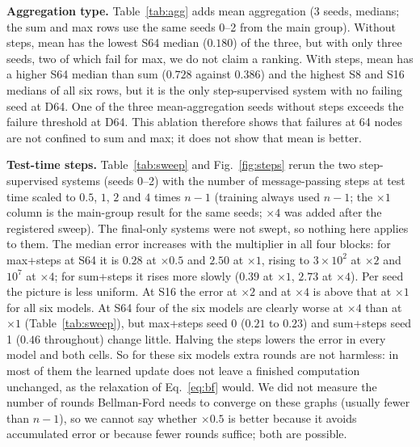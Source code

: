 \textbf{Aggregation type.} Table~\ref{tab:agg} adds mean aggregation (3 seeds, medians; the sum and max rows use the same seeds 0--2 from the main group). Without steps, mean has the lowest S64 median ($0.180$) of the three, but with only three seeds, two of which fail for max, we do not claim a ranking. With steps, mean has a higher S64 median than sum ($0.728$ against $0.386$) and the highest S8 and S16 medians of all six rows, but it is the only step-supervised system with no failing seed at D64. One of the three mean-aggregation seeds without steps exceeds the failure threshold at D64. This ablation therefore shows that failures at 64 nodes are not confined to sum and max; it does not show that mean is better.

\begin{table}[t]\centering\caption{Aggregation ablation, median MAE over seeds 0--2; in parentheses the number of seeds with MAE $>1$ or non-finite.}\label{tab:agg}
\small
\end{table}

\textbf{Test-time steps.} Table~\ref{tab:sweep} and Fig.~\ref{fig:steps} rerun the two step-supervised systems (seeds 0--2) with the number of message-passing steps at test time scaled to $0.5$, $1$, $2$ and $4$ times $n-1$ (training always used $n-1$; the $\times1$ column is the main-group result for the same seeds; $\times4$ was added after the registered sweep). The final-only systems were not swept, so nothing here applies to them. The median error increases with the multiplier in all four blocks: for max+steps at S64 it is $0.28$ at $\times0.5$ and $2.50$ at $\times1$, rising to $3\times10^{2}$ at $\times2$ and $10^{7}$ at $\times4$; for sum+steps it rises more slowly ($0.39$ at $\times1$, $2.73$ at $\times4$). Per seed the picture is less uniform. At S16 the error at $\times2$ and at $\times4$ is above that at $\times1$ for all six models. At S64 four of the six models are clearly worse at $\times4$ than at $\times1$ (Table~\ref{tab:sweep}), but max+steps seed 0 ($0.21$ to $0.23$) and sum+steps seed 1 ($0.46$ throughout) change little. Halving the steps lowers the error in every model and both cells. So for these six models extra rounds are not harmless: in most of them the learned update does not leave a finished computation unchanged, as the relaxation of Eq.~\eqref{eq:bf} would. We did not measure the number of rounds Bellman-Ford needs to converge on these graphs (usually fewer than $n-1$), so we cannot say whether $\times0.5$ is better because it avoids accumulated error or because fewer rounds suffice; both are possible.

